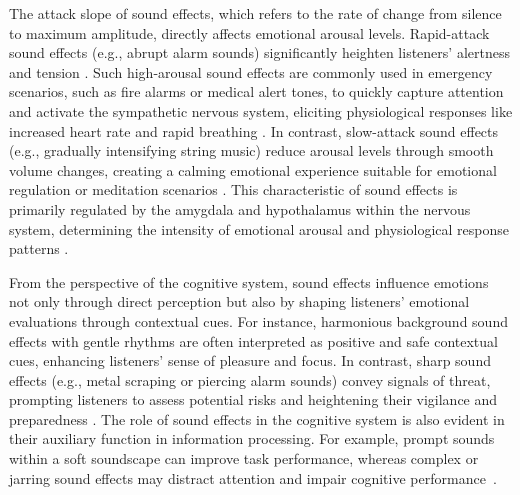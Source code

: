 The attack slope of sound effects, which refers to the rate of change from silence to maximum amplitude, directly affects emotional arousal levels. Rapid-attack sound effects (e.g., abrupt alarm sounds) significantly heighten listeners’ alertness and tension \cite{eerola2012timbre}. Such high-arousal sound effects are commonly used in emergency scenarios, such as fire alarms or medical alert tones, to quickly capture attention and activate the sympathetic nervous system, eliciting physiological responses like increased heart rate and rapid breathing \cite{iversen2000emotional}. In contrast, slow-attack sound effects (e.g., gradually intensifying string music) reduce arousal levels through smooth volume changes, creating a calming emotional experience suitable for emotional regulation or meditation scenarios \cite{zajonc1980feeling}. This characteristic of sound effects is primarily regulated by the amygdala and hypothalamus within the nervous system, determining the intensity of emotional arousal and physiological response patterns \cite{iversen2000emotional}.

From the perspective of the cognitive system, sound effects influence emotions not only through direct perception but also by shaping listeners’ emotional evaluations through contextual cues. For instance, harmonious background sound effects with gentle rhythms are often interpreted as positive and safe contextual cues, enhancing listeners’ sense of pleasure and focus. In contrast, sharp sound effects (e.g., metal scraping or piercing alarm sounds) convey signals of threat, prompting listeners to assess potential risks and heightening their vigilance and preparedness \cite{schulte2001quality}. The role of sound effects in the cognitive system is also evident in their auxiliary function in information processing. For example, prompt sounds within a soft soundscape can improve task performance, whereas complex or jarring sound effects may distract attention and impair cognitive performance~\cite{schulte2001quality}.

